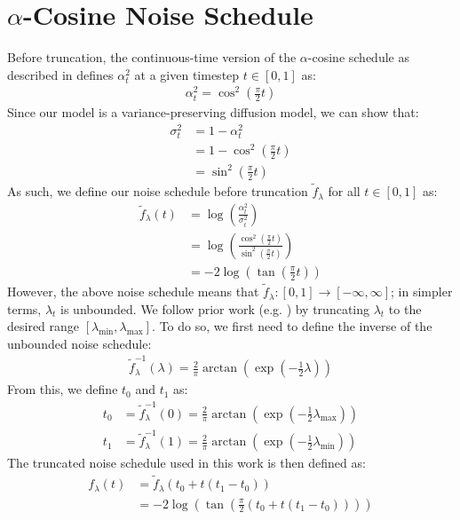 \documentclass[ oneside,%
                    author={George Herbert},
                    degree={MSci},
                     title={Video Diffusion Models for Climate Simulations},
                  subtitle={}]{dissertation}
\begin{document}
\section{$\alpha$-Cosine Noise Schedule}
\label{appx:diffusion_cosine_noise_schedule}

Before truncation, the continuous-time version of the $\alpha$-cosine schedule \cite{IDDPM_Nichol} as described in \cite{Simple_Diffusion_Hoogeboom} defines $\alpha_t^2$ at a given timestep $t\in[0,1]$ as:
\begin{align}
      \alpha_t^2=\cos^2\left(\frac{\pi}{2}t\right)
\end{align}
Since our model is a variance-preserving diffusion model, we can show that:
\begin{align}
      \sigma_t^2&=1-\alpha_t^2\\
      &=1-\cos^2\left(\frac{\pi}{2}t\right)\\
      &=\sin^2\left(\frac{\pi}{2}t\right)
\end{align}
As such, we define our noise schedule before truncation $\tilde{f}_\lambda$ for all $t\in[0,1]$ as:
\begin{align}
      \tilde{f}_\lambda(t)&=\log\left(\frac{\alpha_t^2}{\sigma_t^2}\right)\\
      &=\log\left(\frac{\cos^2\left(\frac{\pi}{2}t\right)}{\sin^2\left(\frac{\pi}{2}t\right)}\right)\\
      &=-2\log\left(\tan\left(\frac{\pi}{2}t\right)\right)
\end{align}
However, the above noise schedule means that $\tilde{f}_\lambda:[0,1]\to[-\infty, \infty]$; in simpler terms, $\lambda_t$ is unbounded. We follow prior work (e.g. \cite{Simple_Diffusion_Hoogeboom,VDM_Ho}) by truncating $\lambda_t$ to the desired range $[\lambda_{\min}, \lambda_{\max}]$. To do so, we first need to define the inverse of the unbounded noise schedule:
\begin{align}
      \tilde{f}_\lambda^{-1}(\lambda)=\frac{2}{\pi}\arctan\left(\exp\left(-\frac{1}{2}\lambda\right)\right)
\end{align}
From this, we define $t_0$ and $t_1$ as:
\begin{align}
      t_0&=\tilde{f}_\lambda^{-1}(0)=\frac{2}{\pi}\arctan\left(\exp\left(-\frac{1}{2}\lambda_{\max}\right)\right)\\
      t_1&=\tilde{f}_\lambda^{-1}(1)=\frac{2}{\pi}\arctan\left(\exp\left(-\frac{1}{2}\lambda_{\min}\right)\right)
\end{align}
The truncated noise schedule used in this work is then defined as:
\begin{align}
      f_\lambda(t)&=\tilde{f}_\lambda(t_0+t(t_1-t_0))\\
      &=-2\log\left(\tan\left(\frac{\pi}{2}(t_0+t(t_1-t_0))\right)\right)
\end{align}

\end{document}
